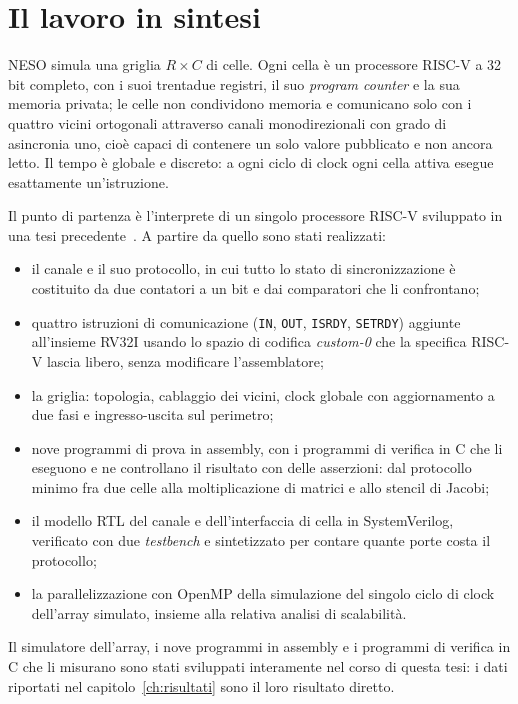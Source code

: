 \section{Il lavoro in sintesi}
\label{sec:sintesi}

NESO simula una griglia $R \times C$ di celle. Ogni cella è un processore
RISC-V a 32 bit completo, con i suoi trentadue registri, il suo \emph{program counter} e
la sua memoria privata; le celle non condividono memoria e comunicano solo con i
quattro vicini ortogonali attraverso canali monodirezionali con grado di
asincronia uno, cioè capaci di contenere un solo valore pubblicato e non ancora
letto.
Il tempo è globale e discreto: a ogni ciclo di clock ogni cella attiva esegue
esattamente un'istruzione.

Il punto di partenza è l'interprete di un singolo processore RISC-V sviluppato in una
tesi precedente~\cite{TesiStella}. A partire da quello sono stati realizzati:

\begin{itemize}
    \item il canale e il suo protocollo, in cui tutto lo stato di
          sincronizzazione è costituito da due contatori a un bit e dai
          comparatori che li confrontano;
    \item quattro istruzioni di comunicazione (\texttt{IN},
          \texttt{OUT}, \texttt{ISRDY}, \texttt{SETRDY}) aggiunte all'insieme
          RV32I usando lo spazio di codifica \emph{custom-0} che la
          specifica RISC-V lascia libero, senza modificare l'assemblatore;
    \item la griglia: topologia, cablaggio dei vicini, clock globale con
          aggiornamento a due fasi e ingresso-uscita sul perimetro;
    \item nove programmi di prova in assembly, con i programmi di
          verifica in C che li eseguono e ne controllano il risultato con delle
          asserzioni: dal protocollo minimo fra due celle alla moltiplicazione
          di matrici e allo stencil di Jacobi;
    \item il modello RTL del canale e dell'interfaccia di cella in
          SystemVerilog, verificato con due \emph{testbench} e sintetizzato per
          contare quante porte costa il protocollo;
    \item la parallelizzazione con OpenMP della simulazione del singolo ciclo
          di clock dell'array simulato, insieme alla relativa analisi di scalabilità.
\end{itemize}
Il simulatore dell'array, i nove programmi in assembly e i programmi di verifica in C che
li misurano sono stati sviluppati interamente nel corso di questa tesi: i dati
riportati nel capitolo~\ref{ch:risultati} sono il loro risultato diretto.

